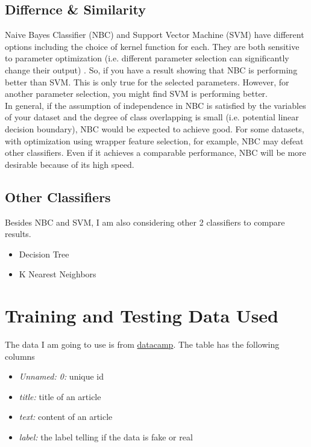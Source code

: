 \documentclass[twoside,twocolumn]{article}
\begin{document}
    \subsection{Differnce \& Similarity}
    Naive Bayes Classifier (NBC) and Support Vector Machine (SVM) have different options including the choice 
    of kernel function for each. They are both sensitive to parameter optimization (i.e. different parameter 
    selection can significantly change their output) . So, if you have a result showing that NBC is performing 
    better than SVM. This is only true for the selected parameters. However, for another parameter selection, 
    you might find SVM is performing better.
    \\In general, if the assumption of independence in NBC is satisfied by the variables of your dataset and the 
    degree of class overlapping is small (i.e. potential linear decision boundary), NBC would be expected to 
    achieve good. For some datasets, with optimization using wrapper feature selection, for example, NBC may 
    defeat other classifiers. Even if it achieves a comparable performance, NBC will be more desirable because 
    of its high speed.

    \subsection{Other Classifiers}
    Besides NBC and SVM, I am also considering other 2 classifiers to compare results.
    \begin{itemize}
        \item Decision Tree
        \item K Nearest Neighbors
    \end{itemize}

    \section{Training and Testing Data Used}
    The data I am going to use is from \href{https://s3.amazonaws.com/assets.datacamp.com/blog_assets/fake_or_real_news.csv}
    {datacamp}. The table has the following columns
    \begin{itemize}
        \item \emph{Unnamed: 0:} unique id
        \item \emph{title:} title of an article
        \item \emph{text:} content of an article
        \item \emph{label:} the label telling if the data is fake or real
    \end{itemize}
\end{document}
